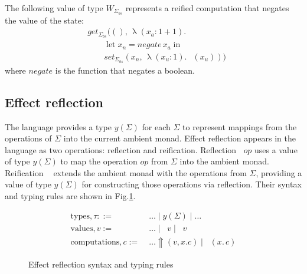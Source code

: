 \documentclass[acmsmall, screen, nonacm]{acmart}
\theoremstyle{definition}
\newcommand{\glob}{\mathop{\Box}}
\newcommand{\yoneda}[1]{y(#1)}
\newcommand{\reflectname}{\Uparrow}
\newcommand{\reflectraw}[1]{\mathop{\reflectname_{#1}}}
\newcommand{\performraw}[2]{\mathop{\reflectname(#1(#2))}}
\newcommand{\perform}[5]{\performraw{#1}{#2}(#3, #4. #5)}
\newcommand{\reifyname}{\Downarrow}
\newcommand{\reifyraw}[1]{\mathop{\reifyname_{#1}}}
\newcommand{\reify}[3]{\reifyraw{#1}(#2.\,#3)}
\newcommand{\outlname}{\mathrm{out}_L}
\newcommand{\outl}[1]{\mathop{\outlname} #1}
\newcommand{\outrname}{\mathrm{out}_R}
\newcommand{\outr}[1]{\mathop{\outrname} #1}
\newcommand{\ind}[1]{W_{#1}}
\newcommand{\indintro}[4]{#2_{#1}(#3,\, #4)}
\newcommand{\retname}{\mathrm{ret}}
\newcommand{\ret}[2]{\mathop{\retname_{#1}}(#2)}
\newcommand{\abs}[3]{\mathop{\lambda}(#1 \types #2).\,#3}
\newcommand{\app}[2]{#1\,#2}
\newcommand{\types}{\mathrel{:}}
\newcommand{\ccons}[2]{#1;\,#2}
\newcommand{\lbind}[3]{\ccons{#1}{#2\types#3}}
\newcommand{\letv}[3]{\mathop{\mathrm{let}} #1 = #2 \mathop{\mathrm{in}} #3}
\newcommand{\turnv}{\mathrel{\vdash_V}}
\newcommand{\turnc}{\mathrel{\vdash_C}}
\begin{document}
\begin{example}
  \label{example:negate}
  The following value of type $\ind{\Sigma_{bs}}$ represents a
  reified computation that negates the value of the state:
  \begin{align*}
    &\indintro{\Sigma_{bs}}{get}{()}{\abs{x_a}{1 + 1}{\\
        &\qquad \letv{x_n}{\app{\mathit{negate}}{x_a}}{\\
          &\qquad \indintro{\Sigma_{bs}}{set}{x_n}{\abs{x_u}{1}{\ret{\Sigma_{bs}}{x_u}}}}}}
  \end{align*}
  where $\mathit{negate}$ is the function that negates a boolean.
\end{example}

\subsection{Effect reflection}

The language provides a type $\yoneda{\Sigma}$ for each $\Sigma$ to
represent mappings from the operations of $\Sigma$ into the current
ambient monad. Effect reflection appears in the language as two
operations: reflection and reification. Reflection
$\reflectraw{\Sigma}{op}$ uses a value of type $\yoneda{\Sigma}$ to map
the operation $op$ from $\Sigma$ into the ambient monad.  Reification
$\reifyraw{\Sigma}$ extends the ambient monad with the operations from
$\Sigma$, providing a value of type $\yoneda{\Sigma}$ for constructing
those operations via reflection. Their syntax and typing rules are shown
in Fig.\ref{fig:typing-reflection}.

\begin{figure}
\begin{align*}
  \mathrm{types}, \tau ::=\;& \ldots \mid \yoneda{\Sigma} \mid \ldots \\
  \mathrm{values}, v :=\;& \ldots \mid \outl{v} \mid \outr{v} \\
  \mathrm{computations}, c :=\;& \ldots \perform{v}{op}{v}{x}{c} \mid \reify{\Sigma}{x}{c}
\end{align*}
\caption{Effect reflection syntax and typing rules}
\label{fig:typing-reflection}
\end{figure}
\end{document}
